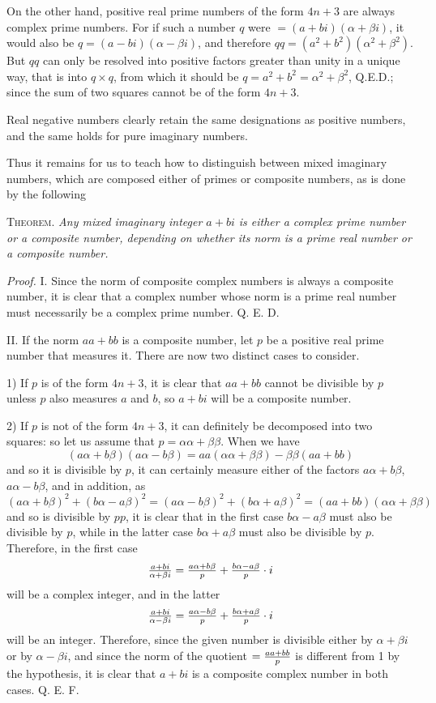 \documentclass[twoside,12pt, showframe]{memoir}
\let\oldfrac\frac
\def\frac#1#2{\mathchoice{\tfrac{#1}{#2}}{\oldfrac{#1}{#2}}{\genfrac{}{}{}{2}{#1}{#2\mathstrut}}{\genfrac{}{}{}{3}{#1}{#2\mathstrut}}}
\begin{document}
On the other hand, positive real prime numbers of the form \(4n+3\) are always complex prime numbers. For if such a number \(q\) were \(=(a+bi)(\alpha+\beta i)\), it would also be \(q=(a-bi)(\alpha-\beta i)\), and therefore \(qq=(a^2+b^2)(\alpha^2+\beta^2)\). But \(qq\) can only be resolved into positive factors greater than unity in a unique way, that is into \(q\times q\), from which it should be \(q=a^2+b^2=\alpha^2+\beta^2\), Q.E.D.; since the sum of two squares cannot be of the form \(4n+3\).
%

Real negative numbers clearly retain the same designations as positive numbers, and the same holds for pure imaginary numbers.

Thus it remains for us to teach how to distinguish between mixed imaginary numbers, which are composed either of primes or composite numbers, as is done by the following

\textsc{Theorem.} \textit{Any mixed imaginary integer \(a+b i\) is either a complex prime number or a composite number, depending on whether its norm is a prime real number or a composite number.}

\textit{Proof.} I. Since the norm of composite complex numbers is always a composite number, it is clear that a complex number whose norm is a prime real number must necessarily be a complex prime number. Q. E. D.

II. If the norm \(a a+b b\) is a composite number, let \(p\) be a positive real prime number that measures it. There are now two distinct cases to consider.

1) If \(p\) is of the form \(4 n+3\), it is clear that \(a a+b b\) cannot be divisible by \(p\) unless \(p\) also measures \(a\) and \(b\), so \(a+b i\) will be a composite number.

2) If \(p\) is not of the form \(4 n+3\), it can definitely be decomposed into two squares: so let us assume that \(p=\alpha \alpha+\beta \beta\). When we have
\[(a \alpha+b \beta)(a \alpha-b \beta)=a a(\alpha \alpha+\beta \beta)-\beta \beta(a a+b b)\]
and so it is divisible by \(p\), it can certainly measure either of the factors \(a \alpha+b \beta\), \(a \alpha-b \beta\), and in addition, as
\[(a \alpha+b \beta)^{2}+(b \alpha-a \beta)^{2}=(a \alpha-b \beta)^{2}+(b \alpha+a \beta)^{2}=(a a+b b)(\alpha \alpha+\beta \beta)\]
and so is divisible by \(p p\), it is clear that in the first case \(b \alpha-a \beta\) must also be divisible by \(p\), while in the latter case \(b \alpha+a \beta\) must also be divisible by \(p\). Therefore, in the first case
\[\frac{a+b i}{\alpha+\beta i}=\frac{a \alpha+b \beta}{p}+\frac{b \alpha-a \beta}{p} \cdot i\]
will be a complex integer, and in the latter
\[\frac{a+b i}{\alpha-\beta i}=\frac{a \alpha-b \beta}{p}+\frac{b \alpha+a \beta}{p} \cdot i\]
will be an integer. Therefore, since the given number is divisible either by \(\alpha+\beta i\) or by \(\alpha-\beta i\), and since the norm of the quotient \(=\frac{a a+b b}{p}\) is different from 1 by the hypothesis, it is clear that \(a+b i\) is a composite complex number in both cases. Q. E. F.
%
\end{document}
